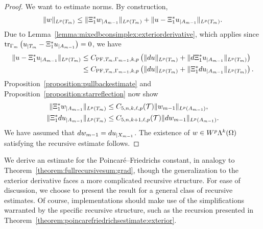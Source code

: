 \documentclass[10pt,a4paper]{article}
\begin{document}
\begin{proof}
    We want to estimate norms. 
    By construction,
    \begin{align*}
        \| w \|_{L^{p}(T_{m})}
        \leq  
        \| \Xi_{1}^{\ast} w_{|A_{m-1}} \|_{L^{p}(T_{m})}
        + 
        \| u - \Xi_{1}^{\ast} u_{|A_{m-1}} \|_{L^{p}(T_{m})}
        .
    \end{align*}
    Due to Lemma~\ref{lemma:mixedbconsimplex:exteriorderivative}, 
    which applies since $\operatorname{tr}_{\Gamma_{m}} \left( u_{|T_m} - \Xi_{1}^{\ast} u_{|A_{m-1}} \right) = 0$, 
    we have
    \begin{align*}
        \| u - \Xi_{1}^{\ast} u_{|A_{m-1}} \|_{L^{p}(T_{m})} 
        &
        \leq 
        C_{{\rm PF},T_{m},\Gamma_{m-1},k,p} 
        \left( 
            \| d u \|_{L^{p}(T_{m})} + \| d \Xi_{1}^{\ast} u_{|A_{m-1}} \|_{L^{p}(T_{m})} 
        \right)
        \\&
        \leq 
        C_{{\rm PF},T_{m},\Gamma_{m-1},k,p} 
        \left( 
            \| d u \|_{L^{p}(T_{m})} + \| \Xi_{1}^{\ast} d u_{|A_{m-1}} \|_{L^{p}(T_{m})} 
        \right)
        .
    \end{align*}
    Proposition~\ref{proposition:pullbackestimate} and Proposition~\ref{proposition:starreflection} now show 
    \begin{align*}
        \| \Xi_{1}^{\ast} w_{|A_{m-1}} \|_{L^{p}(T_{m})}
        &\leq 
        C_{5,n,k,\ell,p}({\mathcal T})
        \| w_{m-1} \|_{L^{p}(A_{m-1})}
        ,
        \\
        \| \Xi_{1}^{\ast} d u_{|A_{m-1}} \|_{L^{p}(T_{m})}
        &\leq 
        C_{5,n,k+1,\ell,p}({\mathcal T})
        \| d w_{m-1} \|_{L^{p}(A_{m-1})}
        .
    \end{align*}
    We have assumed that $d w_{m-1} = d u_{|X_{m-1}}$. 
    The existence of $w \in W^{p}\Lambda^{k}(\Omega)$ satisfying the recursive estimate follows. 
\end{proof}    
    
    
    
    
    
We derive an estimate for the Poincar\'e--Friedrichs constant, in analogy to Theorem~\ref{theorem:fullrecursivesum:grad}, though the generalization to the exterior derivative faces a more complicated recursive structure. 
For ease of discussion, we choose to present the result for a general class of recursive estimates.
Of course, implementations should make use of the simplifications warranted by the specific recursive structure,
such as the recursion presented in Theorem~\ref{theorem:poincarefriedrichsestimate:exterior}. 
\end{document}
